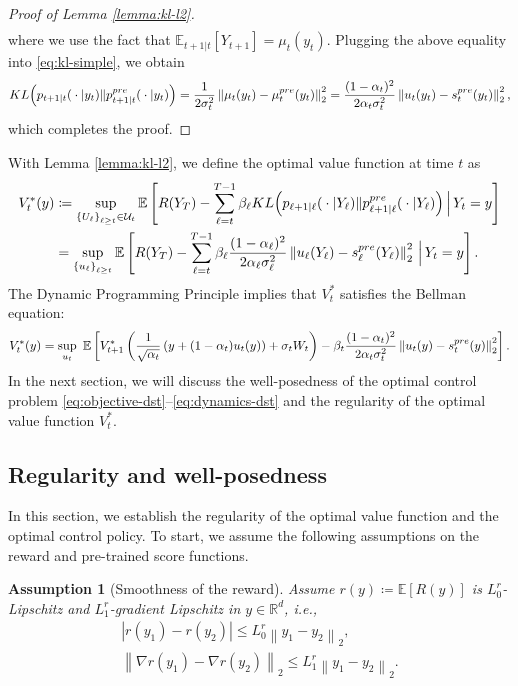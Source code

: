 \documentclass[10pt,a4paper]{amsart}
\newtheorem{Assumption}[Theorem]{Assumption}
\newcommand{\R}{\mathbb{R}}
\newcommand{\curly}[1]{\left\lbrace #1 \right\rbrace}
\newcommand{\bracket}[1]{\left[ #1 \right]}
\newcommand{\parenthesis}[1]{\left( #1 \right)}
\newcommand{\mcal}[1]{\mathcal{#1}}
\newcommand{\abs}[1]{\left |#1\right |}
\newcommand{\norm}[1]{\left \|#1\right \|}
\newcommand{\E}{\mathbb{E}}
\begin{document}
\begin{proof}[Proof of Lemma \ref{lemma:kl-l2}]
\begin{align*}
        \end{align*}
        where we use the fact that $\E_{t+1\vert t}\bracket{Y_{t+1}} = \mu_t(y_t)$.
        Plugging the above equality into \eqref{eq:kl-simple}, we obtain
        \begin{align*}
            {\rm KL}\Big(p_{t+1\vert t}({}\cdot{}\vert y_t) \|p_{t+1\vert t}^{\rm pre}({}\cdot{}\vert y_t)\Big) = \frac{1}{2\sigma_t^2}\norm{\mu_t(y_t) - \mu_t^{\rm pre}(y_t)}_2^2 =  \frac{(1 - \alpha_{t})^{2}}{2\alpha_{t}\sigma_{t}^{2}}\norm{u_{t}(y_t) - s^{\rm pre}_{t}(y_{t})}_{2}^{2},
        \end{align*}
        which completes the proof. 
    \end{proof}

    
    With Lemma \ref{lemma:kl-l2}, we define the optimal value function at time $ t $ as
    \begin{align}
    V^{*}_{t}(y) &\coloneqq \sup_{\curly{U_{\ell}}_{\ell \geq t}\in \mcal{U}_t}\mathbb{E}\left[R(Y_T) - \sum_{\ell = t}^{T-1}\beta_\ell{\rm KL}\Big(p_{\ell+1\vert \ell}({}\cdot{}\vert Y_\ell) \|p_{\ell+1\vert \ell}^{\rm pre}({}\cdot{}\vert Y_\ell)\Big)\,\Big\vert \,Y_t=y\right] \nonumber \\
    &=\sup_{\curly{u_{\ell}}_{\ell \geq t}}\mathbb{E}\left[R(Y_T) - \sum_{\ell = t}^{T-1}\beta_\ell\frac{(1 - \alpha_{\ell})^{2}}{2\alpha_{\ell}\sigma_{\ell}^{2}}\norm{u_{\ell}(Y_\ell) - s^{\rm pre}_{\ell}(Y_{\ell})}_{2}^{2}\,\Big\vert \,Y_t=y\right]. \label{eq:opt-value}
    \end{align}
The Dynamic Programming Principle implies that $V_t^*$ satisfies the Bellman equation:
    \begin{align}
        V^{*}_{t}(y) =\sup_{u_{t}} \ \E\bracket{V^{*}_{t+1}\left(\frac{1}{\sqrt{\alpha_t}}\parenthesis{y + (1 - \alpha_t)u_t(y)} + \sigma_t W_t\right) - \beta_t \frac{(1 - \alpha_{t})^{2}}{2\alpha_{t}\sigma_{t}^{2}}\norm{u_{t}(y) - s^{\rm pre}_{t}(y)}_{2}^{2}}.\label{eq:bellman-V*}
    \end{align} 
In the next section, we will discuss the well-posedness of the optimal control problem \eqref{eq:objective-dst}--\eqref{eq:dynamics-dst} and the regularity of the optimal value function $V_t^*$. 
    
\subsection{Regularity and well-posedness}
In this section, we establish the regularity of the optimal value function and the optimal control policy. To start, we assume the following assumptions on the reward and pre-trained score functions.
\begin{Assumption}[Smoothness of the reward]\label{ass:smooth r}
    Assume $r(y) \coloneqq \mathbb{E}[R(y)]$ is $L_{0}^r$-Lipschitz and $L_{1}^r$-gradient Lipschitz in $y \in \R^d$, i.e.,
    \begin{align}
        \abs{r(y_1) - r(y_2) } \leq L_{0}^r\norm{y_1 - y_2}_2, \\ 
        \norm{\nabla r(y_1) - \nabla r(y_2) }_2 \leq L_{1}^r\norm{y_1 - y_2}_2.
    \end{align}
\end{Assumption}
\end{document}

